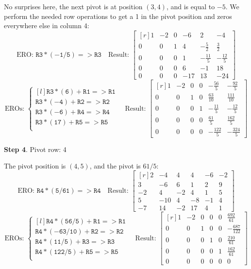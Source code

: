 \documentclass[12pt]{article}
\begin{document}
\begin{example}
No surprises here, the next pivot is at position $(3,4)$, and is equal to $-5$. We perform the needed row operations to get a 1 in the pivot position and zeros everywhere else in column 4:
\[
\text{ERO: }\mathtt{R3*(-1/5)=>R3}\quad\text{Result: }
\left[\begin{matrix*}[r]1 & -2 & 0 & -6 & 2 & -4\\0 & 0 & 1 & 4 & - \frac{5}{2} & \frac{3}{2}\\0 & 0 & 0 & 1 & - \frac{11}{5} & - \frac{12}{5}\\0 & 0 & 0 & 6 & -1 & 18\\0 & 0 & 0 & -17 & 13 & -24\end{matrix*}\right]
\]
\[
\text{EROs: }
\left\{\begin{matrix*}[l]
\mathtt{R3*(6)+R1=>R1}\\
\mathtt{R3*(-4)+R2=>R2}\\
\mathtt{R3*(-6)+R4=>R4}\\
\mathtt{R3*(17)+R5=>R5}\\
\end{matrix*}\right.
\quad 
\text{Result: }
\left[\begin{matrix*}[r]1 & -2 & 0 & 0 & - \frac{56}{5} & - \frac{92}{5}\\0 & 0 & 1 & 0 & \frac{63}{10} & \frac{111}{10}\\0 & 0 & 0 & 1 & - \frac{11}{5} & - \frac{12}{5}\\0 & 0 & 0 & 0 & \frac{61}{5} & \frac{162}{5}\\0 & 0 & 0 & 0 & - \frac{122}{5} & - \frac{324}{5}\end{matrix*}\right]
\]

\textbf{Step 4}. Pivot row: 4

The pivot position is $(4,5)$, and the pivot is $61/5$:
\[
\text{ERO: }\mathtt{R4*(5/61)=>R4}\quad\text{Result: }
\left[\begin{matrix*}[r]2 & -4 & 4 & 4 & -6 & -2\\3 & -6 & 6 & 1 & 2 & 9\\-2 & 4 & -2 & 4 & 1 & 5\\5 & -10 & 4 & -8 & -1 & 4\\-7 & 14 & -2 & 17 & 4 & 1\end{matrix*}\right]
\]
\[
\text{EROs: }
\left\{\begin{matrix*}[l]
\mathtt{R4*(56/5)+R1=>R1}\\
\mathtt{R4*(-63/10)+R2=>R2}\\
\mathtt{R4*(11/5)+R3=>R3}\\
\mathtt{R4*(122/5)+R5=>R5}\\
\end{matrix*}\right.
\quad 
\text{Result: }
\left[\begin{matrix*}[r]1 & -2 & 0 & 0 & 0 & \frac{692}{61}\\0 & 0 & 1 & 0 & 0 & - \frac{687}{122}\\0 & 0 & 0 & 1 & 0 & \frac{210}{61}\\0 & 0 & 0 & 0 & 1 & \frac{162}{61}\\0 & 0 & 0 & 0 & 0 & 0\end{matrix*}\right]
\]


\end{example}
\end{document}
